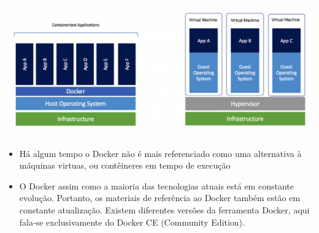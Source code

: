 \documentclass[10pt]{beamer}
\theoremstyle{remark}
\theoremstyle{definition}
\begin{document}
\begin{frame}[allowframebreaks]
	\framebreak
	
	\includegraphics[width=1\textwidth]{images/02.jpg}
	
	\framebreak
	
	\begin{itemize}
		 \item Há algum tempo o Docker não é mais referenciado como uma alternativa à máquinas virtuas, ou contêineres em tempo de execução
		 \item O Docker assim como a maioria das tecnologias atuais está em constante evolução. Portanto, os materiais de referência ao Docker também estão em constante atualização. Existem diferentes versões da ferramenta Docker, aqui fala-se exclusivamente do Docker CE (Community Edition).
	 \end{itemize} 
	
\end{frame}
\end{document}

